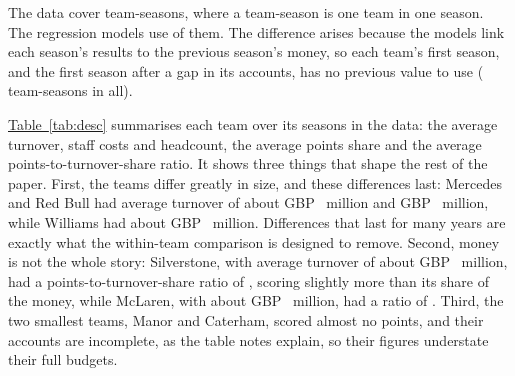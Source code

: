 \documentclass[11pt,a4paper]{article}
\begin{document}
The data cover \NTeamSeasons{} team-seasons, where a team-season is one team in one season. The
regression models use \NObs{} of them. The difference arises because the models link each season's results to the
previous season's money, so each team's first season, and the first season after a gap in its accounts, has no previous
value to use (\NDroppedByLag{} team-seasons in all).

\hyperref[tab:desc]{Table~\ref*{tab:desc}}
summarises each team over its seasons in the data: the average turnover, staff costs and headcount, the average points
share and the average points-to-turnover-share ratio. It shows three things that shape the rest of the paper. First, the teams differ
greatly in size, and these differences last: Mercedes and Red Bull had average turnover of about GBP~\TurnAvgMercedes{}
million and GBP~\TurnAvgRedBull{} million, while Williams had about GBP~\TurnAvgWilliams{} million. Differences that last
for many years are exactly what the within-team comparison is designed to remove. Second, money is not the whole story:
Silverstone, with average turnover of about GBP~\TurnAvgSilverstone{} million, had a points-to-turnover-share ratio of
\EffSilverstone, scoring slightly more than its share of the money, while McLaren, with about GBP~\TurnAvgMcLaren{}
million, had a ratio of \EffMcLaren. Third, the two smallest teams, Manor and Caterham, scored almost no points, and their
accounts are incomplete, as the table notes explain, so their figures understate their full budgets.
\end{document}
